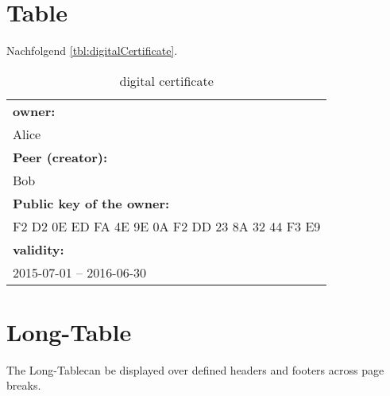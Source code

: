 \section{Table}

Nachfolgend \autoref{tbl:digitalCertificate}.

\begin{table}[H]
	\begin{center}
		\renewcommand{\arraystretch}{1.3}
		\begin{tabular}{|l|}
			\hline
			\textbf{owner:}\\
			Alice \\ \hline
			\textbf{Peer (creator):}\\
			Bob \\ \hline
			\textbf{Public key of the owner:}\\
			F2 D2 0E ED FA 4E 9E 0A F2 DD 23 8A 32 44 F3 E9 \\ \hline
			\textbf{validity:}\\
			2015-07-01 – 2016-06-30 \\ \hline
		\end{tabular}
	\end{center}
	\caption{digital certificate}
	\label{tbl:digitalCertificate}
\end{table}

\section{Long-Table}

The \glqq Long-Table\grqq can be displayed over defined headers and footers across page breaks.


